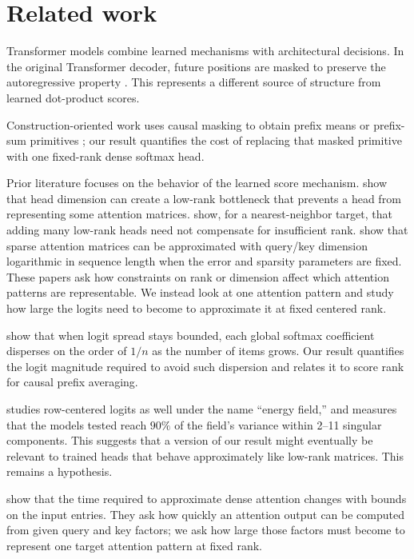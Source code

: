\documentclass[10pt]{article} %
\theoremstyle{definition}
\begin{document}
\section{Related work}

Transformer models combine learned mechanisms with architectural decisions.
In the original Transformer decoder, future positions are masked to preserve
the autoregressive property \citep{vaswani2017attention}. This represents a
different source of structure from learned dot-product scores.

Construction-oriented work uses causal masking to obtain prefix means or
prefix-sum primitives \citep{yang2025cookbook,strobl2025}; our result
quantifies the cost of replacing that masked primitive with one fixed-rank
dense softmax head.

Prior literature focuses on the behavior of the learned score mechanism.
\citet{bhojanapalli2020} show that head dimension can create a low-rank
bottleneck that prevents a head from representing some attention matrices.
\citet{amsel2025quality} show, for a nearest-neighbor target, that
adding many low-rank heads need not compensate for insufficient rank.
\citet{likhosherstov2023} show that sparse attention
matrices can be approximated with query/key dimension logarithmic in sequence
length when the error and sparsity parameters are fixed. These papers ask how constraints on rank or dimension
affect which attention patterns are representable. We instead look at one
attention pattern and study how large the logits need to become to approximate
it at fixed centered rank.

\citet{velickovic2025} show that when logit spread stays bounded, each
global softmax coefficient disperses on the order of \(1/n\) as the number of
items grows. Our result quantifies the logit magnitude
required to avoid such dispersion and relates it to score rank for causal
prefix averaging.

\citet{lee2026compress} studies row-centered logits as well under the name
``energy field,'' and measures that the models tested reach \(90\%\) of the
field's variance within 2--11 singular components. This suggests that a version of our result might
eventually be relevant to trained heads that behave approximately like
low-rank matrices. This remains a hypothesis.

\citet{alman2023} show that the time required to approximate dense attention
changes with bounds on the input entries. They ask how
quickly an attention output can be computed from given query and key factors;
we ask how large those factors must become to represent one target attention
pattern at fixed rank.
\end{document}

